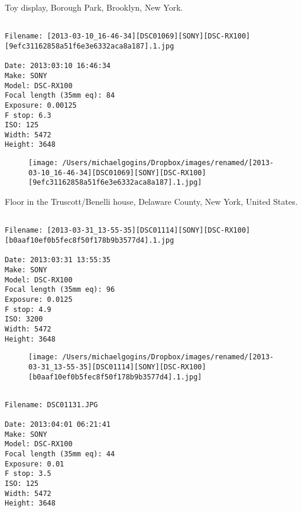 \documentclass[11pt,letter,DIV=14,paper=landscape]{scrbook}
\begin{document}
\clearpage
\noindent Toy display, Borough Park, Brooklyn, New York.
\noindent
\begin{lstlisting}

Filename: [2013-03-10_16-46-34][DSC01069][SONY][DSC-RX100][9efc31162858a51f6e3e6332aca8a187].1.jpg

Date: 2013:03:10 16:46:34
Make: SONY
Model: DSC-RX100
Focal length (35mm eq): 84
Exposure: 0.00125
F stop: 6.3
ISO: 125
Width: 5472
Height: 3648
\end{lstlisting}
\clearpage

\begin{figure}
\texttt{[image: /Users/michaelgogins/Dropbox/images/renamed/[2013-03-10\_16-46-34][DSC01069][SONY][DSC-RX100][9efc31162858a51f6e3e6332aca8a187].1.jpg]}
\end{figure}
    
\clearpage
\noindent Floor in the Truscott/Benelli house, Delaware County, New York, United States.
\noindent
\begin{lstlisting}

Filename: [2013-03-31_13-55-35][DSC01114][SONY][DSC-RX100][b0aaf10ef0b5fec8f50f178b9b3577d4].1.jpg

Date: 2013:03:31 13:55:35
Make: SONY
Model: DSC-RX100
Focal length (35mm eq): 96
Exposure: 0.0125
F stop: 4.9
ISO: 3200
Width: 5472
Height: 3648
\end{lstlisting}
\clearpage

\begin{figure}
\texttt{[image: /Users/michaelgogins/Dropbox/images/renamed/[2013-03-31\_13-55-35][DSC01114][SONY][DSC-RX100][b0aaf10ef0b5fec8f50f178b9b3577d4].1.jpg]}
\end{figure}
    
\clearpage
\noindent 
\noindent
\begin{lstlisting}

Filename: DSC01131.JPG

Date: 2013:04:01 06:21:41
Make: SONY
Model: DSC-RX100
Focal length (35mm eq): 44
Exposure: 0.01
F stop: 3.5
ISO: 125
Width: 5472
Height: 3648
\end{lstlisting}
\clearpage
\end{document}
